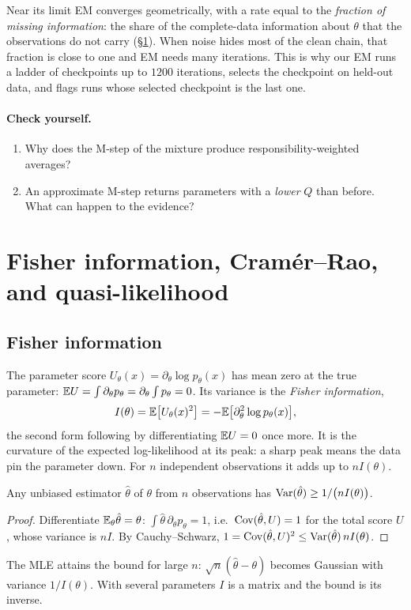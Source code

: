 Near its limit EM converges geometrically, with a rate equal to the \emph{fraction of missing information}: the
share of the complete-data information about $\theta$ that the observations do not carry (\S\ref{sec:fisher}).
When noise hides most of the clean chain, that fraction is close to one and EM needs many iterations. This is
why our EM runs a ladder of checkpoints up to $1200$ iterations, selects the checkpoint on held-out data, and
flags runs whose selected checkpoint is the last one.

\paragraph{Check yourself.}
\begin{enumerate}[label=\thesection.\arabic*,leftmargin=2.2em]
\item Why does the M-step of the mixture produce responsibility-weighted averages?
\item An approximate M-step returns parameters with a \emph{lower} $Q$ than before. What can happen to the evidence?
\end{enumerate}

\section{Fisher information, Cram\'er--Rao, and quasi-likelihood}\label{sec:fisher}

\subsection{Fisher information}

The parameter score $U_\theta(x)=\partial_\theta\log p_\theta(x)$ has mean zero at the true parameter:
$\mathbb{E} U=\int\partial_\theta p_\theta=\partial_\theta\int p_\theta=0$. Its variance is the \emph{Fisher information},
\begin{equation}\label{eq:fisher}
  I(\theta)=\mathbb{E}\big[U_\theta(x)^2\big]=-\mathbb{E}\big[\partial_\theta^2\log p_\theta(x)\big],
\end{equation}
the second form following by differentiating $\mathbb{E} U=0$ once more. It is the curvature of the expected
log-likelihood at its peak: a sharp peak means the data pin the parameter down. For $n$ independent
observations it adds up to $nI(\theta)$.

\begin{proposition}
Any unbiased estimator $\hat\theta$ of $\theta$ from $n$ observations has $\operatorname{Var}(\hat\theta)\ge1/\big(nI(\theta)\big)$.
\end{proposition}
\begin{proof}
Differentiate $\mathbb{E}_\theta\hat\theta=\theta$: $\int\hat\theta\,\partial_\theta p_\theta=1$, i.e.\ $\operatorname{Cov}(\hat\theta,U)=1$ for the total score $U$, whose
variance is $nI$. By Cauchy--Schwarz, $1=\operatorname{Cov}(\hat\theta,U)^2\le\operatorname{Var}(\hat\theta)\,nI(\theta)$.
\end{proof}
The MLE attains the bound for large $n$: $\sqrt n(\hat\theta-\theta)$ becomes Gaussian with variance $1/I(\theta)$. With
several parameters $I$ is a matrix and the bound is its inverse.

